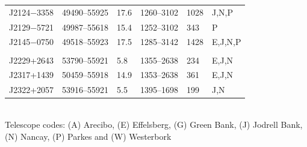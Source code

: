 \begin{table}
\begin{tabular}{p{1.3cm}lp{0.4cm}llp{1cm}}
J2124$-$3358 & 49490--55925  & 17.6  & 1260--3102  & 1028  & J,N,P \\
J2129$-$5721 & 49987--55618  & 15.4  & 1252--3102  & 343  & P \\
J2145$-$0750 & 49518--55923  & 17.5  & 1285--3142  & 1428  & E,J,N,P \\
\\
J2229+2643 & 53790--55921  & 5.8  & 1355--2638  & 234  & E,J,N \\
J2317+1439 & 50459--55918  & 14.9  & 1353--2638  & 361  & E,J,N \\
J2322+2057 & 53916--55921  & 5.5  & 1395--1698  & 199  & J,N \\
\hline
\end{tabular}
~\\
Telescope codes: (A) Arecibo, (E) Effelsberg, (G) Green Bank, (J) Jodrell Bank, (N) Nancay, (P) Parkes and (W) Westerbork
\end{table}
